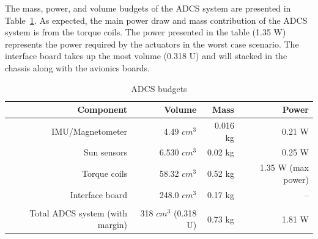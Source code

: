 \documentclass[12pt]{article}
\begin{document}
			The mass, power, and volume budgets of the ADCS system are presented in Table~\ref{tab:ADCS_budget}. As expected, the main power draw and mass contribution of the ADCS system is from the torque coils. The power presented in the table (1.35 W) represents the power required by the actuators in the worst case scenario. The interface board takes up the most volume (0.318 U) and will stacked in the chassis along with the avionics boards. 
			
\begin{table}[htbp]
  \centering
  \caption{ADCS budgets}
    \begin{tabular}{|r|r|r|r|}
    \hline
    \textbf{Component} & \textbf{Volume} & \textbf{Mass} & \textbf{Power} \bigstrut\\
    \hline
    IMU/Magnetometer & 4.49 $cm^3$ & 0.016 kg & 0.21 W \bigstrut\\
    \hline
    Sun sensors & 6.530 $cm^3$ & 0.02 kg & 0.25 W \bigstrut\\
    \hline
    Torque coils & 58.32 $cm^3$ & 0.52 kg & 1.35 W (max power)\bigstrut\\
    \hline
    Interface board & 248.0 $cm^3$ & 0.17 kg & -- \bigstrut\\
    \hline
    \multicolumn{1}{r}{} & \multicolumn{1}{r}{} & \multicolumn{1}{r}{} & \multicolumn{1}{r}{} \bigstrut\\
    \hline
    Total ADCS system (with margin) & 318 $cm^3$ (0.318 U) & 0.73 kg & 1.81 W \bigstrut\\
    \hline
    \end{tabular}%
  \label{tab:ADCS_budget}%
\end{table}%
\end{document}
